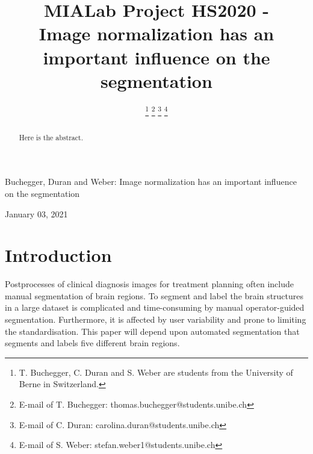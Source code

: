 \documentclass[journal]{IEEEtran}
\begin{document}


\title{MIALab Project HS2020 - \\ Image normalization has an important influence on the segmentation}

\author{ 
\and {} 
\and {} 
\thanks{T. Buchegger, C. Duran and S. Weber are students from the University of Berne in Switzerland.}%
\thanks{E-mail of T. Buchegger: thomas.buchegger@students.unibe.ch}%
\thanks{E-mail of C. Duran: carolina.duran@students.unibe.ch}%
\thanks{E-mail of S. Weber: stefan.weber1@students.unibe.ch}}

%
{Buchegger, Duran and Weber: Image normalization has an important influence on the segmentation}
\maketitle
\newpage



\begin{abstract}
Here is the abstract.


\end{abstract}
\hfill January 03, 2021




\section{Introduction}

	Postprocesses of clinical diagnosis images for treatment planning often include manual segmentation of brain regions. 
	To segment and label the brain structures in a large dataset is complicated and time-consuming by manual operator-guided segmentation. 
	Furthermore, it is affected by user variability and prone to limiting the standardisation. 
	This paper will depend upon automated segmentation that segments and labels five different brain regions. \\
\end{document}
